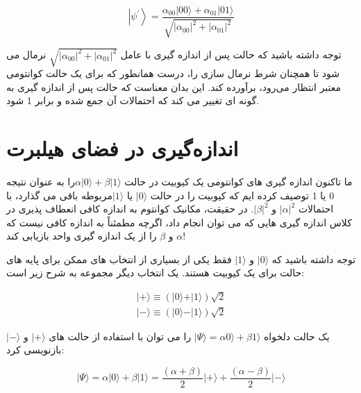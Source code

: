 \documentclass{book}
\begin{document}
\begin{center}
	\begin{equation}\label{psi after mesurment}
		\left|\psi^{\prime}\right\rangle=\frac{\alpha_{00}|00\rangle+\alpha_{01}|01\rangle}{\sqrt{\left|\alpha_{00}\right|^2+\left|\alpha_{01}\right|^2}}
	\end{equation}
\end{center}
توجه داشته باشید که حالت پس از اندازه گیری با عامل $\sqrt{|{α}_{00}|^2 + |{α}_{01}|^2}$ نرمال می شود
تا همچنان شرط نرمال سازی را، درست همانطور که برای یک
حالت کوانتومی معتبر انتظار می‌‌رود، برآورده کند. این بدان معناست که حالت پس از اندازه گیری به گونه ای تغییر می کند که احتمالات آن جمع شده و برابر 1 شود.

\section{اندازه‌گیری در فضای هیلبرت}
ما تاکنون اندازه گیری های کوانتومی یک کیوبیت در حالت $\alpha\vert0\rangle + \beta\vert1\rangle$را به عنوان نتیجه 0 یا 1 توصیف کرده ایم که کیوبیت را در حالت $\vert 0 \rangle$ یا $\vert 1 \rangle$مربوطه باقی می گذارد، با احتمالات $\vert\alpha\vert ^ 2$ و $\vert\beta\vert ^ 2$. در حقیقت، مکانیک کوانتوم به اندازه کافی انعطاف پذیری در کلاس اندازه گیری هایی که می توان انجام داد، اگرچه مطمئناً به اندازه کافی نیست که $\alpha$ و $\beta$ را از یک اندازه گیری واحد بازیابی کند!

توجه داشته باشید که $\vert 0 \rangle$ و $\vert 1 \rangle$ فقط یکی از بسیاری از انتخاب های ممکن برای پایه های حالت برای یک کیوبیت هستند. یک انتخاب دیگر مجموعه به شرح زیر است:

\begin{center}
\begin{equation}\label{ket +-} 
	\begin{split}
	\vert+\rangle  \equiv (\vert0\rangle + \vert1\rangle)\sqrt{2}\\
	\vert-\rangle \equiv  (\vert0\rangle - \vert1\rangle)\sqrt{2}
\end{split}
\end{equation}
\end{center}
 
 
 یک حالت دلخواه $\vert\Psi\rangle = \alpha0\rangle + \beta1\rangle$ را می توان با استفاده از حالت های $\vert + \rangle$ و $\vert - \rangle$ بازنویسی کرد:
\begin{center}
	\begin{equation}\label{basis to forier}
		\vert\Psi\rangle = \alpha \vert0\rangle + \beta\vert1\rangle = \frac{(\alpha + \beta)}{2}\vert+\rangle + \frac{(\alpha - \beta)}{2}\vert-\rangle
	\end{equation}
\end{center}
\end{document}
